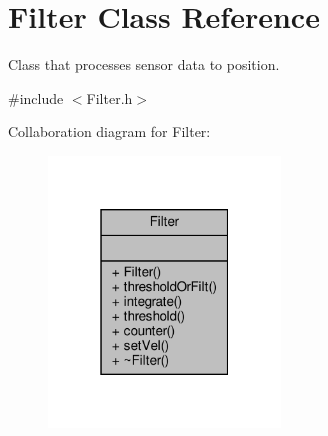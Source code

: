 \hypertarget{classFilter}{}\section{Filter Class Reference}
\label{classFilter}


Class that processes sensor data to position.  




{\ttfamily \#include $<$Filter.\+h$>$}



Collaboration diagram for Filter\+:\nopagebreak
\begin{figure}[H]
\begin{center}
\leavevmode
\includegraphics[width=175pt]{classFilter__coll__graph}
\end{center}
\end{figure}
